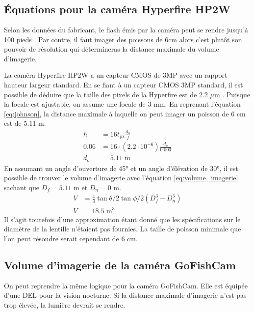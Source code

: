 \chapter{}

\section{Équations pour la caméra Hyperfire HP2W}
\label{annexe:eq_hyperfire}

Selon les données du fabricant, le flash émis par la caméra peut se rendre jusqu'à 100 pieds \cite{HP2W}. Par contre, il faut imager des poissons de 6cm alors c'est plutôt son pouvoir de résolution qui détermineras la distance maximale du volume d'imagerie.

La caméra Hyperfire HP2W a un capteur CMOS de 3MP avec un rapport hauteur largeur standard. En se fiant à un capteur CMOS 3MP standard, il est possible de déduire que la taille des pixels de la Hyperfire est de 2.2 $\mu$m \cite{CMOS_standard}. Puisque la focale est ajustable, on assume une focale de 3 mm. En reprenant l'équation \ref{eq:johnson}, la distance maximale à laquelle on peut imager un poisson de 6 cm est de 5.11 m.
\begin{align*}
    h &= 16t_\text{px} \frac{d_o}{f}\\
    0.06 &= 16 \cdot (2.2\cdot10^{-6}) \frac{d_o}{0.003}\\
    d_o &= 5.11\text{ m}
\end{align*}
En assumant un angle d'ouverture de 45° et un angle d'élévation de 30°, il est possible de trouver le volume d'imagerie avec l'équation \ref{eq:volume_imagerie} sachant que $D_f=5.11$ m et $D_n=0$ m.
\begin{align}
    V &= \frac{4}{3} \tan{\theta/2}\tan{\phi/2} (D_f^3-D_n^3)\\
    V &= 18.5\text{ m}^3
\end{align}
Il s'agit toutefois d'une approximation étant donné que les spécifications sur le diamètre de la lentille n'étaient pas fournies. La taille de poisson minimale que l'on peut résoudre serait cependant de 6 cm.

\section{Volume d'imagerie de la caméra GoFishCam}
\label{annexe:eq_gofishcam}
On peut reprendre la même logique pour la caméra GoFishCam. Elle est équipée d'une DEL pour la vision nocturne. Si la distance maximale d'imagerie n'est pas trop élevée, la lumière devrait se rendre.

